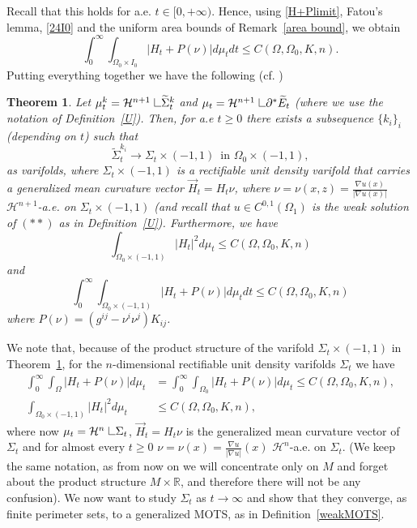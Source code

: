 \documentclass[11pt]{amsart}
\newtheorem{Theorem}{Theorem}
\def\R{\mathbb{R}}
\def\H{\mathcal{H}}
\def\wt{\widetilde}
\def\res{\hbox{ {\vrule height .25cm}{\leaders\hrule\hskip.2cm}}\hskip5.0\mu}
\begin{document}
Recall that this holds for a.e. $t\in[0,+\infty)$. Hence, using \eqref{H+Plimit}, Fatou's lemma, \eqref{24I0} and the uniform area bounds of Remark~\ref{area bound},  we obtain
\begin{equation*} \int_0^\infty\int_{\Omega_0\times I_0}|H_t+P(\nu)|d\mu_tdt\le C(\Omega, \Omega_0, K, n).
 \end{equation*}
 Putting everything together we have the following (cf. \cite[Theorem 5.11]{S08})
\begin{Theorem}\label{mainconvii}
Let  $\mu_t^k=\H^{n+1}\res \wt \Sigma_t^k$ and $\mu_t=\H^{n+1}\res \partial^*\wt E_t$ (where we use the notation of Definition~\ref{U}). Then, for a.e  $t\ge 0$  there exists a subsequence $\{k_i\}_i$ (depending on $t$) such that 
\[\wt\Sigma^{k_i}_t\to \Sigma_t\times (-1,1)\,\,\,\text{in  }\Omega_0\times(-1,1),
\]
as varifolds, where $\Sigma_t\times (-1,1)$ is a rectifiable unit density varifold that carries a generalized mean curvature vector $\vec H_t= H_t\nu$, where $\nu=\nu(x,z)=\frac{\nabla u(x)}{|\nabla u(x)|}$ $\H^{n+1}$-a.e. on $\Sigma_t\times(-1,1)$ (and recall that $u\in C^{0,1}(\Omega_1)$ is the weak solution of $(**)$ as in Definition~\ref{U}). Furthermore, we have
\begin{equation*} 
\int_{\Omega_0\times (-1,1)}|H_t|^2d\mu_t\le C(\Omega, \Omega_0, K, n)
\end{equation*}
and
\[
\int_0^\infty\int_{\Omega_0\times (-1,1)}|H_t+P(\nu)|d\mu_tdt\le C(\Omega, \Omega_0, K, n)
\]
where $P(\nu)=(g^{ij}-\nu^i\nu^j)K_{ij}$.
\end{Theorem}


We note that, because of the product structure of the varifold $\Sigma_t\times (-1,1)$ in Theorem~\ref{mainconvii},  for the $n$-dimensional rectifiable unit density varifolds $\Sigma_t$ we have
\begin{equation}
\label{H+Ptlimi} 
\begin{split}
\int_0^\infty\int_{\Omega}|H_t+P(\nu)|d\mu_t&=\int_0^\infty\int_{\Omega_0}|H_t+P(\nu)|d\mu_t\le C(\Omega, \Omega_0, K, n), \\
\int_{\Omega_0\times (-1,1)}|H_t|^2d\mu_t&\le C(\Omega, \Omega_0, K, n),
\end{split}
\end{equation}
where now $\mu_t=\H^{n}\res\Sigma_t$,  $\vec H_t=H_t \nu$ is the generalized mean curvature vector of $\Sigma_t$ and for almost every $t\ge0$ $\nu=\nu(x)=\frac{\nabla u}{|\nabla u|}(x)$ $\H^n$-a.e. on $\Sigma_t$. (We keep the same notation, as from now on we will concentrate only on $M$ and  forget about the product structure $M\times\R$, and therefore there will not be any confusion). We now want to study $\Sigma_t$ as $t\to \infty$ and show that they converge, as finite perimeter sets,  to a generalized MOTS, as in Definition~\ref{weakMOTS}.
\end{document}

